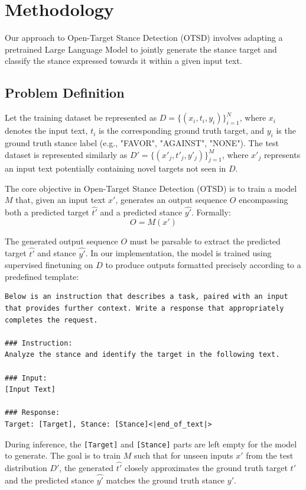 \documentclass[twocolumn,11pt,letterpaper]{article}
\begin{document}
\section{Methodology}
\label{sec:methodology}

Our approach to Open-Target Stance Detection (OTSD) involves adapting a pretrained Large Language Model to jointly generate the stance target and classify the stance expressed towards it within a given input text.

\subsection{Problem Definition}
\label{sec:problem_definition}

Let the training dataset be represented as $D = \{(x_i, t_i, y_i)\}_{i=1}^{N}$, where $x_i$ denotes the input text, $t_i$ is the corresponding ground truth target, and $y_i$ is the ground truth stance label (e.g., "FAVOR", "AGAINST", "NONE"). The test dataset is represented similarly as $D' = \{(x'_j, t'_j, y'_j)\}_{j=1}^{M}$, where $x'_j$ represents an input text potentially containing novel targets not seen in $D$.

The core objective in Open-Target Stance Detection (OTSD) is to train a model $M$ that, given an input text $x'$, generates an output sequence $O$ encompassing both a predicted target $\hat{t'}$ and a predicted stance $\hat{y'}$.
Formally:
\[ O = M(x') \]

The generated output sequence $O$ must be parsable to extract the predicted target $\hat{t'}$ and stance $\hat{y'}$. In our implementation, the model is trained using supervised finetuning on $D$ to produce outputs formatted precisely according to a predefined template:

\begin{lstlisting}[basicstyle=\small\ttfamily,columns=flexible,breaklines=true,breakatwhitespace=true,frame=single]
Below is an instruction that describes a task, paired with an input that provides further context. Write a response that appropriately completes the request.

### Instruction:
Analyze the stance and identify the target in the following text.

### Input:
[Input Text]

### Response:
Target: [Target], Stance: [Stance]<|end_of_text|>
\end{lstlisting}

During inference, the \texttt{[Target]} and \texttt{[Stance]} parts are left empty for the model to generate. The goal is to train $M$ such that for unseen inputs $x'$ from the test distribution $D'$, the generated $\hat{t'}$ closely approximates the ground truth target $t'$ and the predicted stance $\hat{y'}$ matches the ground truth stance $y'$.
\end{document}

